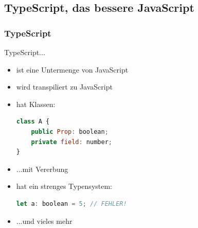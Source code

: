 \documentclass[12pt]{beamer}
\begin{document}
\subsection{TypeScript, das bessere JavaScript}
\begin{frame}[fragile]
	\frametitle{TypeScript}
	TypeScript...
	\begin{itemize}
		\item ist eine Untermenge von JavaScript
		\item wird transpiliert zu JavaScript
		\item hat Klassen:\\
		\begin{lstlisting}[language=JavaScript]
class A {
	public Prop: boolean;
	private field: number;
}
		\end{lstlisting}
		\item ...mit Vererbung
		\item hat ein strenges Typensystem:\\
		\begin{lstlisting}[language=JavaScript]
let a: boolean = 5; // FEHLER!
		\end{lstlisting}
		\item ...und vieles mehr
	\end{itemize}
\end{frame}
\end{document}
